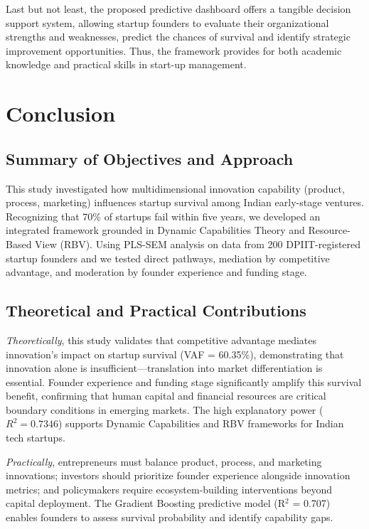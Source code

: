 \documentclass{ieeeaccess}
\begin{document}
Last but not least, the proposed predictive dashboard offers a tangible decision support system, allowing startup founders to evaluate their organizational strengths and weaknesses, predict the chances of survival and identify strategic improvement opportunities. Thus, the framework provides for both academic knowledge and practical skills in start-up management.

\section{Conclusion}
\label{sec:conclusion}

\subsection{Summary of Objectives and Approach}

This study investigated how multidimensional innovation capability (product, process, marketing) influences startup survival among Indian early-stage ventures. Recognizing that 70\% of startups fail within five years, we developed an integrated framework grounded in Dynamic Capabilities Theory and Resource-Based View (RBV). Using PLS-SEM analysis on data from 200 DPIIT-registered startup founders and we tested direct pathways, mediation by competitive advantage, and moderation by founder experience and funding stage.

\subsection{Theoretical and Practical Contributions}

\textit{Theoretically}, this study validates that competitive advantage mediates innovation's impact on startup survival (VAF = 60.35\%), demonstrating that innovation alone is insufficient—translation into market differentiation is essential. Founder experience and funding stage significantly amplify this survival benefit, confirming that human capital and financial resources are critical boundary conditions in emerging markets. The high explanatory power ($R^2 = 0.7346$) supports Dynamic Capabilities and RBV frameworks for Indian tech startups.

\textit{Practically}, entrepreneurs must balance product, process, and marketing innovations; investors should prioritize founder experience alongside innovation metrics; and policymakers require ecosystem-building interventions beyond capital deployment. The Gradient Boosting predictive model (R$^2$ = 0.707) enables founders to assess survival probability and identify capability gaps.
\end{document}
